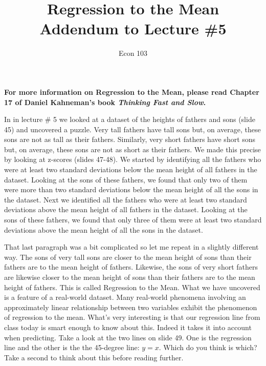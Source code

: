 \documentclass[12pt]{article}
\title{Regression to the Mean\\ \large Addendum to Lecture \#5}
\author{Econ 103}
\begin{document}
\maketitle

\noindent\textbf{For more information on Regression to the Mean, please read Chapter 17 of Daniel Kahneman's book \emph{Thinking Fast and Slow}.}

\vspace{1em}

In in lecture \# 5 we looked at a dataset of the heights of fathers and sons (slide 45) and uncovered a puzzle.
Very tall fathers have tall sons but, on average, these sons are not as tall as their fathers.
Similarly, very short fathers have short sons but, on average, these sons are not as short as their fathers.
We made this precise by looking at z-scores (slides 47-48).
We started by identifying all the fathers who were at least two standard deviations below the mean height of all fathers in the dataset.
Looking at the sons of these fathers, we found that only two of them were more than two standard deviations below the mean height of all the sons in the dataset.
Next we identified all the fathers who were at least two standard deviations above the mean height of all fathers in the dataset.
Looking at the sons of these fathers, we found that only three of them were at least two standard deviations above the mean height of all the sons in the dataset.

That last paragraph was a bit complicated so let me repeat in a slightly different way.
The sons of very tall sons are closer to the mean height of sons than their fathers are to the mean height of fathers.
Likewise, the sons of very short fathers are likewise closer to the mean height of sons than their fathers are to the mean height of fathers.
This is called Regression to the Mean.
What we have uncovered is a feature of a real-world dataset.
Many real-world phenomena involving an approximately linear relationship between two variables exhibit the phenomenon of regression to the mean.
What's very interesting is that our regression line from class today is smart enough to know about this.
Indeed it takes it into account when predicting.
Take a look at the two lines on slide 49.
One is the regression line and the other is the the 45-degree line: $y=x$. Which do you think is which?
Take a second to think about this before reading further.
\end{document}
